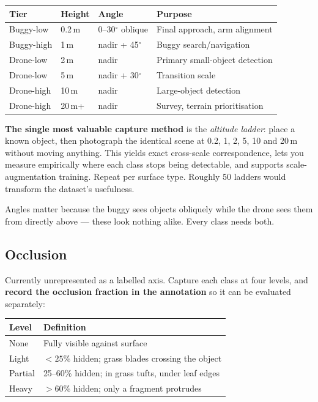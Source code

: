 \documentclass[11pt,a4paper]{article}
\begin{document}
\begin{center}
\begin{tabular}{llll}
\toprule
\textbf{Tier} & \textbf{Height} & \textbf{Angle} & \textbf{Purpose} \\
\midrule
Buggy-low   & 0.2\,m & 0--30$^\circ$ oblique & Final approach, arm alignment \\
Buggy-high  & 1\,m   & nadir + 45$^\circ$    & Buggy search/navigation \\
Drone-low   & 2\,m   & nadir                 & Primary small-object detection \\
Drone-low   & 5\,m   & nadir + 30$^\circ$    & Transition scale \\
Drone-high  & 10\,m  & nadir                 & Large-object detection \\
Drone-high  & 20\,m+ & nadir                 & Survey, terrain prioritisation \\
\bottomrule
\end{tabular}
\end{center}

\noindent \textbf{The single most valuable capture method} is the
\emph{altitude ladder}: place a known object, then photograph the identical
scene at 0.2, 1, 2, 5, 10 and 20\,m without moving anything. This yields exact
cross-scale correspondence, lets you measure empirically where each class stops
being detectable, and supports scale-augmentation training. Repeat per surface
type. Roughly 50 ladders would transform the dataset's usefulness.

Angles matter because the buggy sees objects obliquely while the drone sees them
from directly above --- these look nothing alike. Every class needs both.

\subsection{Occlusion}

Currently unrepresented as a labelled axis. Capture each class at four levels,
and \textbf{record the occlusion fraction in the annotation} so it can be
evaluated separately:

\begin{center}
\begin{tabular}{ll}
\toprule
\textbf{Level} & \textbf{Definition} \\
\midrule
None    & Fully visible against surface \\
Light   & $<25\%$ hidden; grass blades crossing the object \\
Partial & 25--60\% hidden; in grass tufts, under leaf edges \\
Heavy   & $>60\%$ hidden; only a fragment protrudes \\
\bottomrule
\end{tabular}
\end{center}
\end{document}
